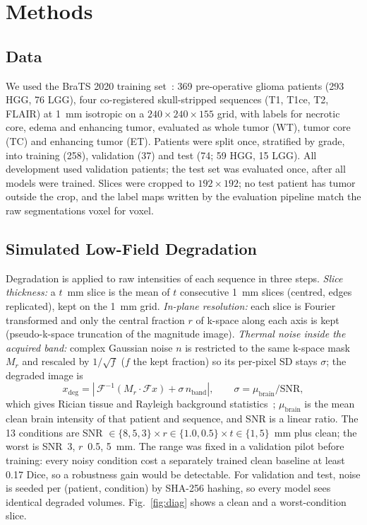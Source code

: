 \documentclass[conference]{IEEEtran}
\begin{document}
\section{Methods}

\subsection{Data}
We used the BraTS 2020 training set~\cite{menze2015brats,bakas2017tcga,bakas2018brats}: 369 pre-operative glioma
patients (293 HGG, 76 LGG), four co-registered skull-stripped sequences (T1, T1ce, T2, FLAIR) at 1~mm isotropic
on a $240\times240\times155$ grid, with labels for necrotic core, edema and enhancing tumor, evaluated as whole
tumor (WT), tumor core (TC) and enhancing tumor (ET). Patients were split once, stratified by grade, into
training (258), validation (37) and test (74; 59 HGG, 15 LGG). All development used validation patients; the
test set was evaluated once, after all models were trained. Slices were cropped to $192\times192$; no test
patient has tumor outside the crop, and the label maps written by the evaluation pipeline match the raw
segmentations voxel for voxel.

\subsection{Simulated Low-Field Degradation}
Degradation is applied to raw intensities of each sequence in three steps. \emph{Slice thickness:} a $t$~mm slice
is the mean of $t$ consecutive 1~mm slices (centred, edges replicated), kept on the 1~mm grid. \emph{In-plane
resolution:} each slice is Fourier transformed and only the central fraction $r$ of k-space along each axis is
kept (pseudo-k-space truncation of the magnitude image). \emph{Thermal noise inside the acquired band:} complex
Gaussian noise $n$ is restricted to the same k-space mask $M_r$ and rescaled by $1/\sqrt{f}$ ($f$ the kept
fraction) so its per-pixel SD stays $\sigma$; the degraded image is
\begin{equation}
x_{\mathrm{deg}} = \left|\,\mathcal{F}^{-1}(M_r\cdot\mathcal{F}x) + \sigma\, n_{\mathrm{band}}\right|,
\qquad \sigma = \mu_{\mathrm{brain}}/\mathrm{SNR},
\end{equation}
which gives Rician tissue and Rayleigh background statistics~\cite{gudbjartsson1995rician}; $\mu_{\mathrm{brain}}$
is the mean clean brain intensity of that patient and sequence, and SNR is a linear ratio. The 13 conditions are
SNR $\in\{8,5,3\}\times r\in\{1.0,0.5\}\times t\in\{1,5\}$~mm plus clean; the worst is SNR~3, $r$~0.5, 5~mm. The
range was fixed in a validation pilot before training: every noisy condition cost a separately trained clean
baseline at least 0.17 Dice, so a robustness gain would be detectable. For validation and test, noise is seeded
per (patient, condition) by SHA-256 hashing, so every model sees identical degraded volumes. Fig.~\ref{fig:diag}
shows a clean and a worst-condition slice.
\end{document}
